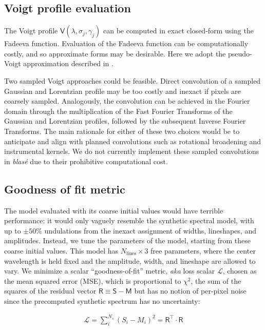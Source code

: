 \documentclass[modern]{aastex631}
\begin{document}
\subsection{Voigt profile evaluation}
The Voigt profile $\mathsf{V}(\lambda, \sigma_j, \gamma_j)$ can be computed in exact closed-form using the Fadeeva function. Evaluation of the Fadeeva function can be computationally costly, and so approximate forms may be desirable. Here we adopt the pseudo-Voigt approximation described in .

Two sampled Voigt approaches could be feasible. Direct convolution of a sampled Gaussian and Lorentzian profile may be too costly and inexact if pixels are coarsely sampled. Analogously, the convolution can be achieved in the Fourier domain through the multiplication of the Fast Fourier Transforms of the Gaussian and Lorentzian profiles, followed by the subsequent Inverse Fourier Transforms. The main rationale for either of these two choices would be to anticipate and align with planned convolutions such as rotational broadening and instrumental kernels. We do not currently implement these sampled convolutions in \emph{blas\'e} due to their prohibitive computational cost.


\subsection{Goodness of fit metric}
The model evaluated with its coarse initial values would have terrible performance: it would only vaguely resemble the synthetic spectral model, with up to $\pm 50\%$ undulations from the inexact assignment of widths, lineshapes, and amplitudes. Instead, we tune the parameters of the model, starting from these coarse initial values. This model has $N_{\mathrm{lines}}\times 3$ free parameters, where the center wavelength is held fixed and the amplitude, width, and lineshape are allowed to vary. We minimize a scalar ``goodness-of-fit'' metric, \emph{aka} loss scalar $\mathcal{L}$, chosen as the mean squared error (MSE), which is proportional to $\chi^2$, the sum of the squares of the residual vector $\mathsf{R} \equiv \mathsf{S}-\mathsf{M}$ but has no notion of per-pixel noise since the precomputed synthetic spectrum has no uncertainty:

\begin{eqnarray}
 \mathcal{L} = \sum_i^{N_s} (S_i - M_i)^2 = \mathsf{R^\intercal}\cdot \mathsf{R}
\end{eqnarray}
\end{document}
